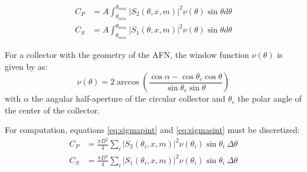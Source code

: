 \documentclass[journal]{IEEEtran}
\begin{document}
\begin{align}
    C_{\scriptstyle{P}}&=A\int_{\theta_{min}}^{\theta_{max}}|S_2(\theta, x, m)|^2\nu(\theta)\sin{\theta}d\theta \label{eq:sigmapint}\\
    C_{\scriptstyle{S}}&=A\int_{\theta_{min}}^{\theta_{max}}|S_1(\theta, x, m)|^2\nu(\theta)\sin{\theta}d\theta \label{eq:sigmasint}
\end{align}
\par For a collector with the geometry of the AFN, the window function $\nu(\theta)$ is given by \cite{hodkinson_response_1965} as:
\begin{equation}\label{weightfn}
    \nu(\theta)=2\arccos\left(\frac{\cos \alpha -\cos \theta_c\cos \theta }{\sin \theta_c \sin \theta }\right)
\end{equation}
with $\alpha$ the angular half-aperture of the circular collector and $\theta_c$ the polar angle of the center of the collector.
\par For computation, equations \ref{eq:sigmapint} and \ref{eq:sigmasint} must be discretized:
\begin{align}
    C_P&=\frac{\pi D^2}{4}\sum_{i}|S_2(\theta_i, x, m)|^2 \nu(\theta_i)\sin{\theta_i}\ \Delta\theta\\
    C_S&=\frac{\pi D^2}{4}\sum_{i}|S_1(\theta_i, x, m)|^2 \nu(\theta_i)\sin{\theta_i}\ \Delta\theta
\end{align}
\end{document}
